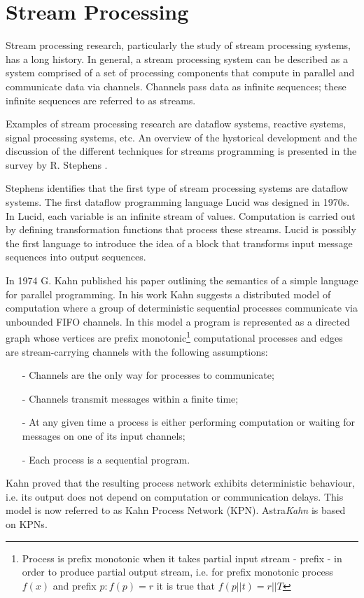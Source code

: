     \section{Stream Processing}
Stream processing research, particularly the study of stream processing systems, has a long history. In general, a stream processing system can be described as a system comprised of a set of processing components that compute in parallel and communicate data via channels. Channels pass data as infinite sequences; these infinite sequences are referred to as streams.

Examples of stream processing research are dataflow systems, reactive systems, signal processing systems, etc. An overview of the hystorical development and the discussion of the different techniques for streams programming is presented in the survey by R. Stephens \cite{stephens97}.

Stephens identifies that the first type of stream processing systems are dataflow systems. The first dataflow programming language Lucid \cite{lucid} was designed in 1970s. In Lucid, each variable is an infinite stream of values. Computation is carried out by defining transformation functions that process these streams. Lucid is possibly the first language to introduce the idea of a block that transforms input message sequences into output sequences.

In 1974 G. Kahn published his paper \cite{kahn74} outlining the semantics of a simple language for parallel programming. In his work Kahn suggests a distributed model of computation where a group of deterministic sequential processes communicate via unbounded FIFO channels. In this model a program is represented as a directed graph whose vertices are prefix monotonic\footnote{Process is prefix monotonic when it takes partial input stream - prefix - in order to produce partial output stream, i.e. for prefix monotonic process $f(x)$ and prefix $p : f(p)=r$ it is true that $f(p || t) = r || T$} computational processes and edges are stream-carrying channels with the following assumptions:
\begin{itemize}
\item[-]Channels are the only way for processes to communicate;
\item[-]Channels transmit messages within a finite time;
\item[-]At any given time a process is either performing computation or waiting for messages on one of its input channels;
\item[-]Each process is a sequential program.
\end{itemize}
Kahn proved that the resulting process network exhibits deterministic behaviour, i.e. its output does not depend on computation or communication delays. This model is now referred to as Kahn Process Network (KPN). Astra\emph{Kahn} is based on KPNs.

